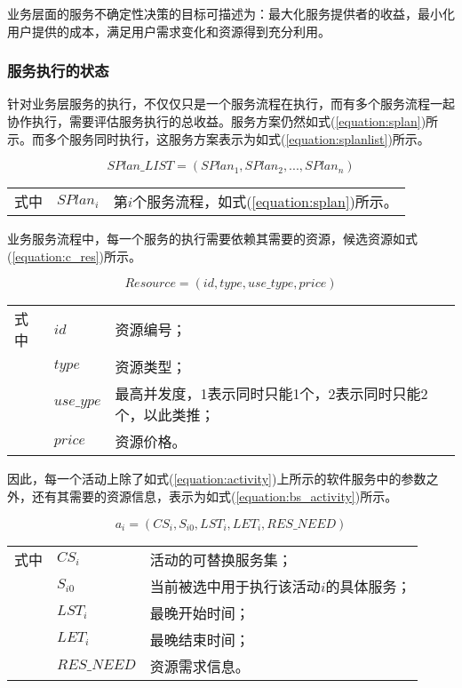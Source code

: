 业务层面的服务不确定性决策的目标可描述为：最大化服务提供者的收益，最小化用户提供的成本，满足用户需求变化和资源得到充分利用。

\subsubsection{服务执行的状态}

针对业务层服务的执行，不仅仅只是一个服务流程在执行，而有多个服务流程一起协作执行，需要评估服务执行的总收益。服务方案仍然如式(\ref{equation:splan})所示。而多个服务同时执行，这服务方案表示为如式(\ref{equation:splanlist})所示。

\begin{equation}\label{equation:splanlist}
SPlan\_LIST = \left(SPlan_1, SPlan_2, ..., SPlan_n\right)
\end{equation}
\begin{tabularx}{\textwidth}{@{}l@{\quad}l@{\pozhehao }X@{}}
    式中
    & ${SPlan_i}$ & 第$i$个服务流程，如式(\ref{equation:splan})所示。
\end{tabularx}\vspace{\wordsep}

业务服务流程中，每一个服务的执行需要依赖其需要的资源，候选资源如式(\ref{equation:c_res})所示。

\begin{equation}\label{equation:c_res}
Resource = \left(id, type, use\_type, price \right)
\end{equation}
\begin{tabularx}{\textwidth}{@{}l@{\quad}l@{\pozhehao }X@{}}
    式中
    & ${id}$ & 资源编号；\\
    & ${type}$ & 资源类型；\\
    & ${use\_ype}$ & 最高并发度，1表示同时只能1个，2表示同时只能2个，以此类推；\\
    & ${price}$ & 资源价格。
\end{tabularx}\vspace{\wordsep}

因此，每一个活动上除了如式(\ref{equation:activity})上所示的软件服务中的参数之外，还有其需要的资源信息，表示为如式(\ref{equation:bs_activity})所示。

\begin{equation}\label{equation:bs_activity}
{a_i} = ({CS_i}, {S_{i0}}, {LST_i}, {LET_i}, {RES\_NEED})
\end{equation}
\begin{tabularx}{\textwidth}{@{}l@{\quad}l@{\pozhehao }X@{}}
    式中
    & ${CS_i}$ & 活动的可替换服务集；\\
    & ${S_{i0}}$ & 当前被选中用于执行该活动$i$的具体服务；\\
    & ${LST_i}$ & 最晚开始时间；\\
    & ${LET_i}$ & 最晚结束时间； \\
    & ${RES\_NEED}$ & 资源需求信息。
\end{tabularx}\vspace{\wordsep}

